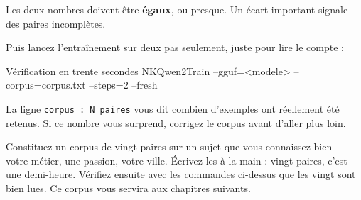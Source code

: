 Les deux nombres doivent être \textbf{égaux}, ou presque. Un écart important
signale des paires incomplètes.

Puis lancez l'entraînement sur deux pas seulement, juste pour lire le compte :

\begin{nkcode}[]{Vérification en trente secondes}
NKQwen2Train --gguf=<modele> --corpus=corpus.txt --steps=2 --fresh
\end{nkcode}

La ligne \texttt{corpus : N paires} vous dit combien d'exemples ont réellement
été retenus. Si ce nombre vous surprend, corrigez le corpus avant d'aller plus
loin.

\begin{nkexo}
Constituez un corpus de vingt paires sur un sujet que vous connaissez bien —
votre métier, une passion, votre ville. Écrivez-les à la main : vingt paires,
c'est une demi-heure. Vérifiez ensuite avec les commandes ci-dessus que les
vingt sont bien lues. Ce corpus vous servira aux chapitres suivants.
\end{nkexo}
